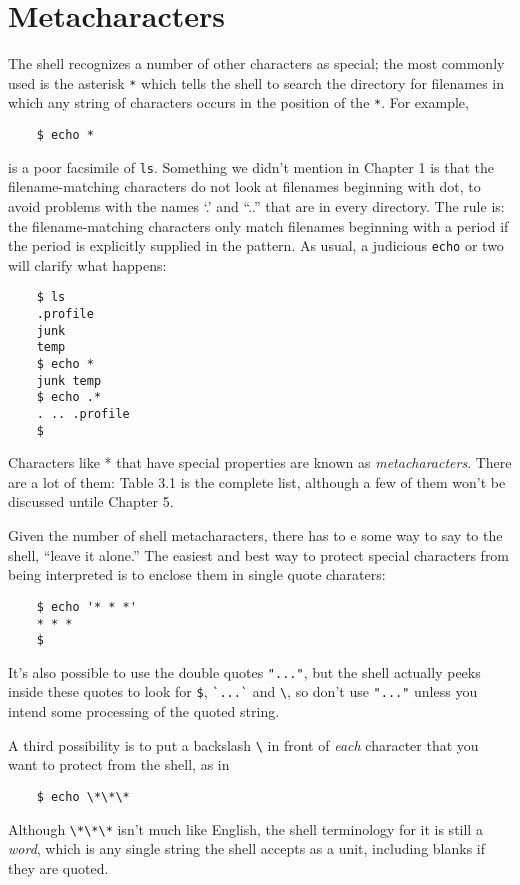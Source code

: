\section{Metacharacters}
    The shell recognizes a number of other characters as special; the most commonly
used is the asterisk \texttt{*} which tells the shell to search the directory for
filenames in which any string of characters occurs in the position of the \texttt{*}. For
example, 
\begin{verbatim}
    $ echo *
\end{verbatim}
is a poor facsimile of \texttt{ls}. Something we didn't mention in Chapter 1 is that
the filename-matching characters do not look at filenames beginning with
dot, to avoid problems with the names `.' and ``..'' that are in every directory.
The rule is: the filename-matching characters only match filenames beginning
with a period if the period is explicitly supplied in the pattern. As usual, a
judicious \texttt{echo} or two will clarify what happens:
\begin{verbatim}
    $ ls
    .profile
    junk
    temp
    $ echo *
    junk temp
    $ echo .*
    . .. .profile
    $
\end{verbatim}

    Characters like * that have special properties are known as \emph{metacharacters}.
There are a lot of them: Table 3.1 is the complete list, although a few of them
won't be discussed untile Chapter 5.

    Given the number of shell metacharacters, there has to e some way to say
to the shell, ``leave it alone.'' The easiest and best way to protect special
characters from being interpreted is to enclose them in single quote charaters:
\begin{verbatim}
    $ echo '* * *'
    * * *
    $
\end{verbatim}
It's also possible to use the double quotes \verb="..."=, but the shell actually peeks
inside these quotes to look for \verb=$=, \verb=`...`= and \verb=\=, so don't use \verb="..."= unless you
intend some processing of the quoted string.

    A third possibility is to put a backslash \verb=\= in front of \emph{each} character that you
want to protect from the shell, as in
\begin{verbatim}
    $ echo \*\*\*
\end{verbatim}
Although \verb=\*\*\*= isn't much like English, the shell terminology for it is still a
\emph{word}, which is any single string the shell accepts as a unit, including blanks if
they are quoted.


